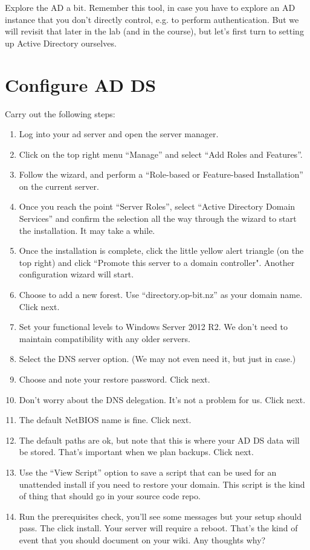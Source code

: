 \documentclass{article}
\begin{document}
Explore the AD a bit. Remember this tool, in case you have to explore an AD instance that you don't directly control, e.g. to perform authentication. But we will revisit that later in the lab (and in the course), but let's first turn to setting up Active Directory ourselves.


\section{Configure AD DS}
Carry out the following steps:

\begin{enumerate}
	\item Log into your ad server and open the server manager.
	\item Click on the top right menu ``Manage'' and select ``Add Roles and Features''.
	\item Follow the wizard, and perform a ``Role-based or Feature-based Installation'' on the current server.
	\item Once you reach the point ``Server Roles'', select ``Active Directory Domain Services'' and confirm the selection all the way through the wizard to start the installation. It may take a while.
	\item Once the installation is complete, click the little yellow alert triangle (on the top right) and click ``Promote this server to a domain controller". Another configuration wizard will start.
	\item Choose to add a new forest. Use ``directory.op-bit.nz'' as your domain name. Click next.
	\item Set your functional levels to Windows Server 2012 R2. We don't need to maintain compatibility with any older servers.
	\item Select the DNS server option. (We may not even need it, but just in case.)
	\item Choose and note your restore password. Click next.
	\item Don't worry about the DNS delegation. It's not a problem for us. Click next.
	\item The default NetBIOS name is fine. Click next.
	\item The default paths are ok, but note that this is where your AD DS data will be stored. That's important when we plan backups. Click next.
	\item Use the ``View Script'' option to save a script that can be used for an unattended install if you need to restore your domain. This script is the kind of thing that should go in your source code repo.
	\item Run the prerequisites check, you'll see some messages but your setup should pass. The click install.  Your server will require a reboot. That's the kind of event that you should document on your wiki. Any thoughts why?
\end{enumerate}
\end{document}
